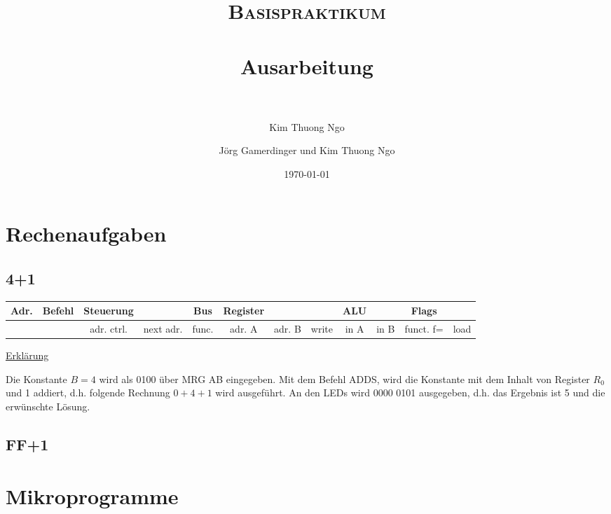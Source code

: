 \documentclass[paper=a4, fontsize=11pt]{scrartcl}
\author{Kim Thuong Ngo}
\title{	
\normalfont \normalsize 
\textsc{Basispraktikum} \\ [25pt] 
\horrule{0.5pt} \\[0.4cm] 
\huge Ausarbeitung \\ 
\horrule{2pt} \\[0.5cm] 
}
\author{Jörg Gamerdinger und Kim Thuong Ngo}
\date{\normalsize\today}
\numberwithin{equation}{section}
\numberwithin{figure}{section}
\numberwithin{table}{section}
\begin{document}
\maketitle 

\newpage

\tableofcontents

\newpage


\section{Rechenaufgaben}


\subsection{4+1}

\begin{tabular}{|c|c|cc|c|ccc|ccc|c|}
Adr. & Befehl &Steuerung & & Bus & Register & & & ALU & & Flags & \\
\hline
& & adr. ctrl. & next adr. & func. & adr. A & adr. B & write & in A & in B & funct. f= & load \\
\hline
\end{tabular}

\underline{Erklärung}

Die Konstante $B=4$ wird als 0100 über MRG AB eingegeben. Mit dem Befehl ADDS, wird die Konstante mit dem Inhalt von Register $R_{0}$ und 1 addiert, d.h. folgende Rechnung $0+4+1$ wird ausgeführt. An den LEDs wird 0000 0101 ausgegeben, d.h. das Ergebnis ist 5 und die erwünschte Lösung.


\subsection{FF+1}


\newpage

\section{Mikroprogramme}
\end{document}
